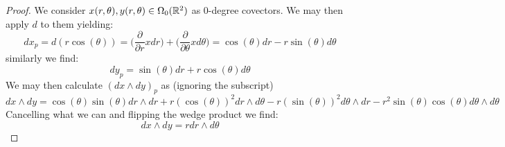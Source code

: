 \begin{problem}
\end{problem}
\begin{proof}
	We consider $x(r,\theta), y(r, \theta) \in \Omega_0(\mathbb{R}^2)$ as 0-degree covectors. We may then apply $d$ to them
	yielding:
	$$dx_p = d(r\cos(\theta)) = \bigg(\frac{\partial}{\partial r}x dr\bigg) + \bigg(\frac{\partial}{\partial \theta}x d\theta\bigg)
		= \cos(\theta)dr - r\sin(\theta)d\theta$$
	similarly we find:
	$$dy_p =  \sin(\theta)dr + r\cos(\theta)d\theta$$
	We may then calculate $(dx \wedge dy)_p$ as (ignoring the subscript)
	$$dx \wedge dy = \cos(\theta) \sin(\theta) dr \wedge dr + r(\cos(\theta))^2 dr \wedge d\theta
		- r(\sin(\theta))^2 d\theta \wedge dr - r^2\sin(\theta)\cos(\theta)d\theta \wedge d\theta$$
	Cancelling what we can and flipping the wedge product we find:
	$$dx \wedge dy = r dr \wedge d\theta$$
\end{proof}

